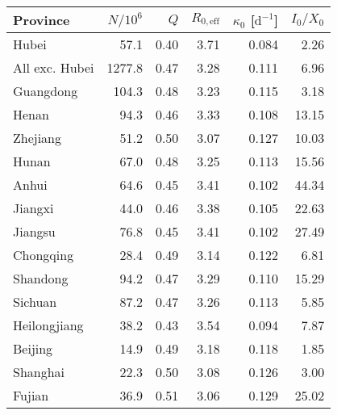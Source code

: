 \begin{tabular}{lrrrrr}
\hline
 Province       &   $N/10^6$ &   $Q$ &   $R_{0,\mathrm{eff}}$ &   $\kappa_{0}$ [$\mathrm{d}^{-1}$] &   $I_0/X_0$ \\
\hline
 Hubei          &       57.1 &  0.40 &                   3.71 &                              0.084 &        2.26 \\
 All exc. Hubei &     1277.8 &  0.47 &                   3.28 &                              0.111 &        6.96 \\
 Guangdong      &      104.3 &  0.48 &                   3.23 &                              0.115 &        3.18 \\
 Henan          &       94.3 &  0.46 &                   3.33 &                              0.108 &       13.15 \\
 Zhejiang       &       51.2 &  0.50 &                   3.07 &                              0.127 &       10.03 \\
 Hunan          &       67.0 &  0.48 &                   3.25 &                              0.113 &       15.56 \\
 Anhui          &       64.6 &  0.45 &                   3.41 &                              0.102 &       44.34 \\
 Jiangxi        &       44.0 &  0.46 &                   3.38 &                              0.105 &       22.63 \\
 Jiangsu        &       76.8 &  0.45 &                   3.41 &                              0.102 &       27.49 \\
 Chongqing      &       28.4 &  0.49 &                   3.14 &                              0.122 &        6.81 \\
 Shandong       &       94.2 &  0.47 &                   3.29 &                              0.110 &       15.29 \\
 Sichuan        &       87.2 &  0.47 &                   3.26 &                              0.113 &        5.85 \\
 Heilongjiang   &       38.2 &  0.43 &                   3.54 &                              0.094 &        7.87 \\
 Beijing        &       14.9 &  0.49 &                   3.18 &                              0.118 &        1.85 \\
 Shanghai       &       22.3 &  0.50 &                   3.08 &                              0.126 &        3.00 \\
 Fujian         &       36.9 &  0.51 &                   3.06 &                              0.129 &       25.02 \\

\end{tabular}
